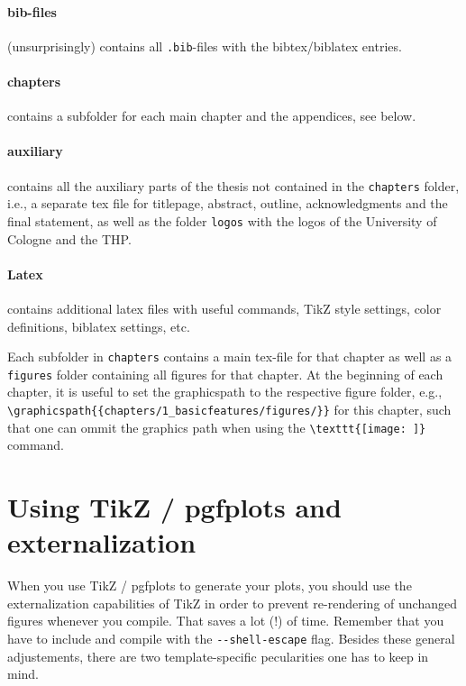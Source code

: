 \paragraph{bib-files} (unsurprisingly) contains all \verb|.bib|-files with the bibtex/biblatex entries.
\paragraph{chapters} contains a subfolder for each main chapter and the appendices, see below.
\paragraph{auxiliary} contains all the auxiliary parts of the thesis not contained in the \verb|chapters| folder, i.e., a separate tex file for titlepage, abstract, outline, acknowledgments and the final statement, as well as the folder \verb|logos| with the logos of the University of Cologne and the THP.
\paragraph{Latex} contains additional latex files with useful commands, TikZ style settings, color definitions, biblatex settings, etc.

Each subfolder in \verb|chapters| contains a main tex-file for that chapter as well as a \verb|figures| folder containing all figures for that chapter.
At the beginning of each chapter, it is useful to set the graphicspath to the respective figure folder, e.g., \verb|\graphicspath{{chapters/1_basicfeatures/figures/}}| for this chapter, such that one can ommit the graphics path when using the \verb|\texttt{[image: ]}| command.



\section{Using TikZ / pgfplots and externalization}
When you use TikZ / pgfplots to generate your plots, you should use the externalization capabilities of TikZ in order to prevent re-rendering of unchanged figures whenever you compile. That saves a lot (!) of time. 
Remember that you have to include \verb|| and compile with the \verb|--shell-escape| flag. Besides these general adjustements, there are two template-specific pecularities one has to keep in mind. 

